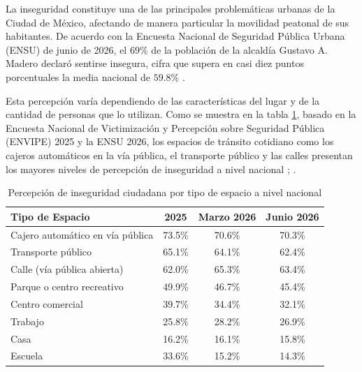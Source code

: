
La inseguridad constituye una de las principales problemáticas urbanas de la Ciudad de México, afectando de manera particular la movilidad peatonal de sus habitantes. De acuerdo con la Encuesta Nacional de Seguridad Pública Urbana (ENSU) de junio de 2026, el $69\%$ de la población de la alcaldía Gustavo A. Madero declaró sentirse insegura, cifra que supera en casi diez puntos porcentuales la media nacional de $59.8\%$ \cite[p. 5]{2026ensu}.

Esta percepción varía dependiendo de las características del lugar y de la cantidad de personas que lo utilizan. Como se muestra en la tabla \ref{tab:percepcion_inseguridad}, basado en la Encuesta Nacional de Victimización y Percepción sobre Seguridad Pública (ENVIPE) 2025 y la ENSU 2026, los espacios de tránsito cotidiano como los cajeros automáticos en la vía pública, el transporte público y las calles presentan los mayores niveles de percepción de inseguridad a nivel nacional \cite[p. 31]{ENVIPE2025}; \cite[p. 8]{2026ensu}.


\begin{table}[htbp]
    \centering
    \caption[Percepción de inseguridad ciudadana por tipo de espacio]{Percepción de inseguridad ciudadana por tipo de espacio a nivel nacional \cite{ENVIPE2025, 2026ensu}}
    \begin{tabular}{|l|c|c|c|}
        \hline
        \textbf{Tipo de Espacio} & \textbf{2025} & \textbf{Marzo 2026} & \textbf{Junio 2026} \\ \hline
        Cajero automático en vía pública & 73.5\% & 70.6\% & 70.3\% \\ \hline
        Transporte público & 65.1\% & 64.1\% & 62.4\% \\ \hline
        Calle (vía pública abierta) & 62.0\% & 65.3\% & 63.4\% \\ \hline
        Parque o centro recreativo & 49.9\% & 46.7\% & 45.4\% \\ \hline
        Centro comercial & 39.7\% & 34.4\% & 32.1\% \\ \hline
        Trabajo & 25.8\% & 28.2\% & 26.9\% \\ \hline
        Casa & 16.2\% & 16.1\% & 15.8\% \\ \hline
        Escuela & 33.6\% & 15.2\% & 14.3\% \\ \hline
    \end{tabular}
    \label{tab:percepcion_inseguridad}
\end{table}


